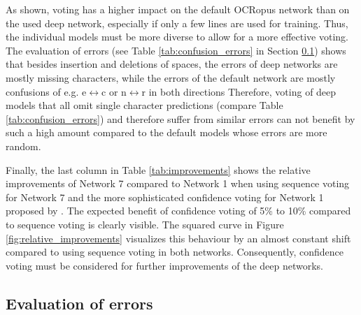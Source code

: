 \documentclass{jlcl}
\begin{document}
As shown, voting has a higher impact on the default OCRopus network than on the used deep network, especially if only a few lines are used for training.
Thus, the individual models must be more diverse to allow for a more effective voting.
The evaluation of errors (see Table \ref{tab:confusion_errors} in Section \ref{sec:evaluation_of_errors}) shows that besides insertion and deletions of spaces, the errors of deep networks are mostly missing characters, while the errors of the default network are mostly confusions of e.g. e$\leftrightarrow$c or n$\leftrightarrow$r in both directions
Therefore, voting of deep models that all omit single character predictions (compare Table \ref{tab:confusion_errors}) and therefore suffer from similar errors can not benefit by such a high amount compared to the default models whose errors are more random.

Finally, the last column in Table \ref{tab:improvements} shows the relative improvements of Network 7 compared to Network 1 when using sequence voting for Network 7 and the more sophisticated confidence voting for Network 1 proposed by \cite{reul2017voting}.
The expected benefit of confidence voting of 5\% to 10\% compared to sequence voting is clearly visible.
The squared curve in Figure \ref{fig:relative_improvements} visualizes this behaviour by an almost constant shift compared to using sequence voting in both networks.
Consequently, confidence voting must be considered for further improvements of the deep networks.

\subsection{Evaluation of errors}
\label{sec:evaluation_of_errors}
\end{document}
